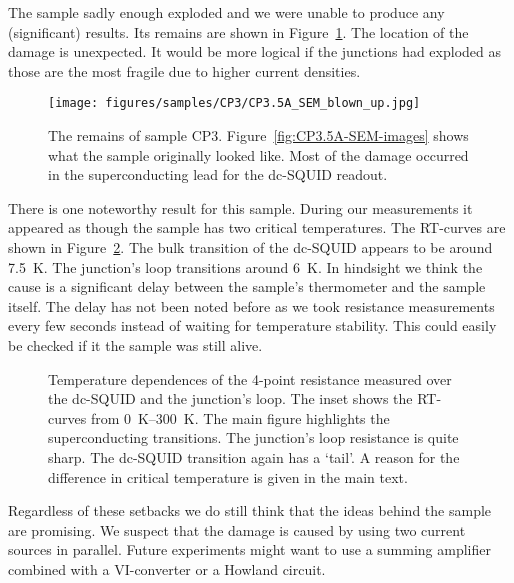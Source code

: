 The sample sadly enough exploded and we were unable to produce any (significant) results. Its remains are shown in Figure~\ref{fig:CP3.5A-remains}. The location of the damage is unexpected. It would be more logical if the junctions had exploded as those are the most fragile due to higher current densities.

\begin{figure}
  \begin{minipage}[c]{0.55\textwidth}
    \centering
	\texttt{[image: figures/samples/CP3/CP3.5A\_SEM\_blown\_up.jpg]}
  \end{minipage}
  \hfill
  \begin{minipage}[c]{0.4\textwidth}
    \caption{
       The remains of sample CP3. Figure~\ref{fig:CP3.5A-SEM-images} shows what the sample originally looked like. Most of the damage occurred in the superconducting lead for the dc-SQUID readout.
    }
	\label{fig:CP3.5A-remains}
  \end{minipage}
\end{figure}

There is one noteworthy result for this sample. During our measurements it appeared as though the sample has two critical temperatures. The RT-curves are shown in Figure~\ref{fig:CP3.5A_RT_curves}. The bulk transition of the dc-SQUID appears to be around \qty{7.5}{\kelvin}. The junction's loop transitions around \qty{6}{\kelvin}. In hindsight we think the cause is a significant delay between the sample's thermometer and the sample itself. The delay has not been noted before as we took resistance measurements every few seconds instead of waiting for temperature stability. This could easily be checked if it the sample was still alive.

\begin{figure}[ht!]
	\centering
	
	\caption{Temperature dependences of the 4-point resistance measured over the dc-SQUID and the junction's loop. The inset shows the RT-curves from \qtyrange{0}{300}{\kelvin}. The main figure highlights the superconducting transitions. The junction's loop resistance is quite sharp. The dc-SQUID transition again has a `tail'. A reason for the difference in critical temperature is given in the main text.}
	\label{fig:CP3.5A_RT_curves}
\end{figure}

Regardless of these setbacks we do still think that the ideas behind the sample are promising. We suspect that the damage is caused by using two current sources in parallel. Future experiments might want to use a summing amplifier combined with a VI-converter or a Howland circuit.